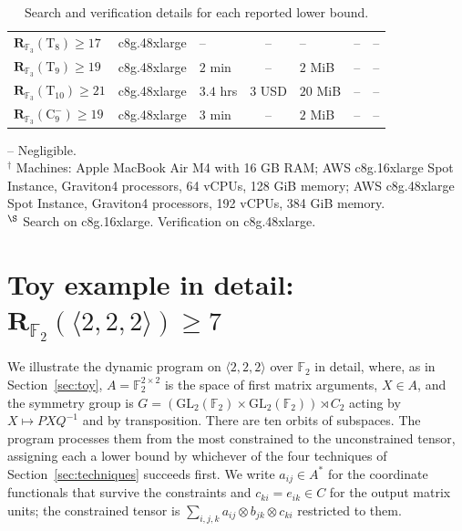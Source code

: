 \documentclass[11pt]{article}
\theoremstyle{definition}
\newcommand{\F}{\mathbb{F}}
\newcommand{\Rk}[2]{\mathbf{R}_{#1}(#2)}
\newcommand{\Trunct}[1]{\mathrm{T}_{#1}}
\newcommand{\Negat}[1]{\mathrm{C}^{-}_{#1}}
\newcommand{\GL}{\mathrm{GL}}
\newcommand{\mmt}[3]{\langle #1,#2,#3\rangle}
\begin{document}
\begin{table}[!ht]
\begin{tabular}{lllcllc}
    $\Rk{\F_3}{\Trunct{8}}\ge 17$             & c8g.48xlarge             & --                        & --                        & --                       & --                        & --                        \\
    $\Rk{\F_3}{\Trunct{9}}\ge 19$             & c8g.48xlarge             & $2$ min                   & --                        & $2$ MiB                  & --                        & --                        \\
    $\Rk{\F_3}{\Trunct{10}}\ge 21$            & c8g.48xlarge             & $3.4$ hrs                 & $3$ USD                   & $20$ MiB                 & --                        & --                        \\
    \midrule
    $\Rk{\F_3}{\Negat{9}}\ge 19$              & c8g.48xlarge             & $3$ min                   & --                        & $2$ MiB                  & --                        & --                        \\
    \bottomrule
  \end{tabular}

  \smallskip
  {\footnotesize\raggedright
    -- Negligible.\\
    $^\dagger$ Machines: Apple MacBook Air M4 with 16 GB RAM; AWS c8g.16xlarge Spot
    Instance, Graviton4 processors, 64 vCPUs, 128 GiB memory; AWS c8g.48xlarge Spot
    Instance, Graviton4 processors, 192 vCPUs, 384 GiB memory.\\
    $^\S$ Search on c8g.16xlarge. Verification on c8g.48xlarge.\\
    \par
  }
  \caption{Search and verification details for each reported lower bound.}
  \label{tab:results}
\end{table}

\clearpage
\section{Toy example in detail: \texorpdfstring{$\Rk{\F_2}{\mmt{2}{2}{2}}\ge 7$}{rank over F2 of <2,2,2> >= 7}}\label{sec:toy-in-detail}

We illustrate the dynamic program on $\mmt{2}{2}{2}$ over $\F_2$ in detail, where, as in
Section~\ref{sec:toy}, $A=\F_2^{2\times2}$ is the space of first matrix arguments,
$X\in A$, and the symmetry group is
$G=(\GL_2(\F_2)\times\GL_2(\F_2))\rtimes C_2$ acting by $X\mapsto PXQ^{-1}$ and by
transposition. There are ten orbits of subspaces. The program processes
them from the most constrained to the unconstrained tensor, assigning each a lower
bound by whichever of the four techniques of Section~\ref{sec:techniques} succeeds
first. We write $a_{ij}\in A^*$ for the coordinate functionals that survive the constraints
and $c_{ki}=e_{ik}\in C$ for the output matrix units; the constrained tensor is
$\sum_{i,j,k} a_{ij}\otimes b_{jk}\otimes c_{ki}$ restricted to them.
\end{document}
